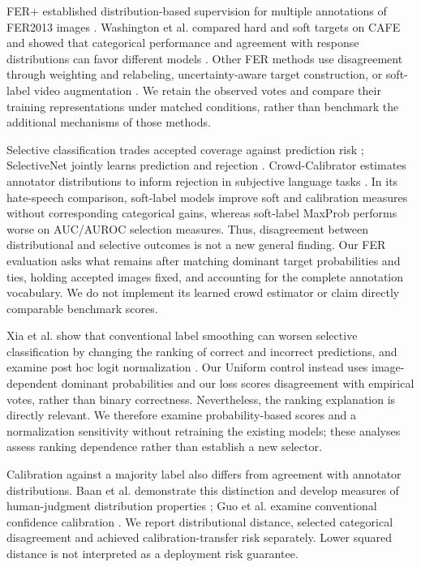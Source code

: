FER+ established distribution-based supervision for multiple annotations of FER2013 images \cite{barsoum2016ferplus}. Washington et al. compared hard and soft targets on CAFE and showed that categorical performance and agreement with response distributions can favor different models \cite{washington2021crowdsourcing}. Other FER methods use disagreement through weighting and relabeling, uncertainty-aware target construction, or soft-label video augmentation \cite{wang2020scn,le2023uncertainty,kawamura2024midas}. We retain the observed votes and compare their training representations under matched conditions, rather than benchmark the additional mechanisms of those methods.

Selective classification trades accepted coverage against prediction risk \cite{geifman2017selective}; SelectiveNet jointly learns prediction and rejection \cite{geifman2019selectivenet}. Crowd-Calibrator estimates annotator distributions to inform rejection in subjective language tasks \cite{khurana2024crowd}. In its hate-speech comparison, soft-label models improve soft and calibration measures without corresponding categorical gains, whereas soft-label MaxProb performs worse on AUC/AUROC selection measures. Thus, disagreement between distributional and selective outcomes is not a new general finding. Our FER evaluation asks what remains after matching dominant target probabilities and ties, holding accepted images fixed, and accounting for the complete annotation vocabulary. We do not implement its learned crowd estimator or claim directly comparable benchmark scores.

Xia et al. show that conventional label smoothing can worsen selective classification by changing the ranking of correct and incorrect predictions, and examine post hoc logit normalization \cite{xia2025smoothing}. Our Uniform control instead uses image-dependent dominant probabilities and our loss scores disagreement with empirical votes, rather than binary correctness. Nevertheless, the ranking explanation is directly relevant. We therefore examine probability-based scores and a normalization sensitivity without retraining the existing models; these analyses assess ranking dependence rather than establish a new selector.

Calibration against a majority label also differs from agreement with annotator distributions. Baan et al. demonstrate this distinction and develop measures of human-judgment distribution properties \cite{baan2022calibration}; Guo et al. examine conventional confidence calibration \cite{guo2017calibration}. We report distributional distance, selected categorical disagreement and achieved calibration-transfer risk separately. Lower squared distance is not interpreted as a deployment risk guarantee.

